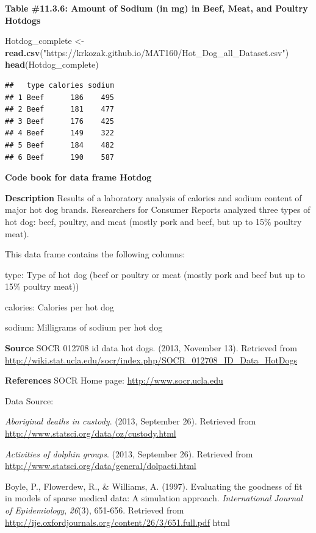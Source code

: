 \documentclass[]{book}
\newenvironment{Shaded}{\begin{snugshade}}{\end{snugshade}}
\newcommand{\KeywordTok}[1]{\textcolor[rgb]{0.13,0.29,0.53}{\textbf{#1}}}
\newcommand{\NormalTok}[1]{#1}
\newcommand{\StringTok}[1]{\textcolor[rgb]{0.31,0.60,0.02}{#1}}
\begin{document}
\textbf{Table \#11.3.6: Amount of Sodium (in mg) in Beef, Meat, and Poultry Hotdogs}

\begin{Shaded}
\begin{Highlighting}[]
\NormalTok{Hotdog_complete <-}\StringTok{ }\KeywordTok{read.csv}\NormalTok{(}\StringTok{"https://krkozak.github.io/MAT160/Hot_Dog_all_Dataset.csv"}\NormalTok{)}
\KeywordTok{head}\NormalTok{(Hotdog_complete)}
\end{Highlighting}
\end{Shaded}

\begin{verbatim}
##   type calories sodium
## 1 Beef      186    495
## 2 Beef      181    477
## 3 Beef      176    425
## 4 Beef      149    322
## 5 Beef      184    482
## 6 Beef      190    587
\end{verbatim}

\textbf{Code book for data frame Hotdog}

\textbf{Description}
Results of a laboratory analysis of calories and sodium content of major hot dog brands. Researchers for Consumer Reports analyzed three types of hot dog: beef, poultry, and meat (mostly pork and beef, but up to 15\% poultry meat).

This data frame contains the following columns:

type: Type of hot dog (beef or poultry or meat (mostly pork and beef but up to 15\% poultry meat))

calories: Calories per hot dog

sodium: Milligrams of sodium per hot dog

\textbf{Source}
SOCR 012708 id data hot dogs. (2013, November 13). Retrieved from
\url{http://wiki.stat.ucla.edu/socr/index.php/SOCR_012708_ID_Data_HotDogs}

\textbf{References}
SOCR Home page: \url{http://www.socr.ucla.edu}

Data Source:

\emph{Aboriginal deaths in custody}. (2013, September 26). Retrieved from
\url{http://www.statsci.org/data/oz/custody.html}

\emph{Activities of dolphin groups}. (2013, September 26). Retrieved from
\url{http://www.statsci.org/data/general/dolpacti.html}

Boyle, P., Flowerdew, R., \& Williams, A. (1997). Evaluating the goodness
of fit in models of sparse medical data: A simulation approach.
\emph{International Journal of Epidemiology}, \emph{26}(3), 651-656. Retrieved
from \url{http://ije.oxfordjournals.org/content/26/3/651.full.pdf} html
\end{document}
